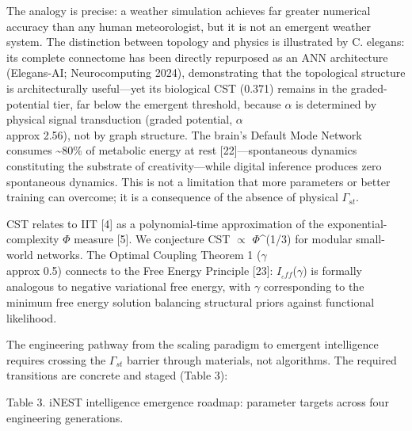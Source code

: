\documentclass[a4paper,12pt]{article}
\begin{document}
The analogy is precise: a weather simulation achieves far greater numerical accuracy than any human meteorologist, but it is not an emergent weather system. The distinction between topology and physics is illustrated by C. elegans: its complete connectome has been directly repurposed as an ANN architecture (Elegans-AI; Neurocomputing 2024), demonstrating that the topological structure is architecturally useful---yet its biological CST (0.371) remains in the graded-potential tier, far below the emergent threshold, because $\alpha$ is determined by physical signal transduction (graded potential, $\alpha$  \\approx  2.56), not by graph structure. The brain's Default Mode Network consumes \textasciitilde{}80\% of metabolic energy at rest [22]---spontaneous dynamics constituting the substrate of creativity---while digital inference produces zero spontaneous dynamics. This is not a limitation that more parameters or better training can overcome; it is a consequence of the absence of physical $\Gamma_{st}$.


CST relates to IIT [4] as a polynomial-time approximation of the exponential-complexity $\Phi$ measure [5]. We conjecture CST $\propto$ $\Phi$^(1/3) for modular small-world networks. The Optimal Coupling Theorem 1 ($\gamma$  \\approx  0.5) connects to the Free Energy Principle [23]: $I_{_eff}$($\gamma$) is formally analogous to negative variational free energy, with $\gamma$ corresponding to the minimum free energy solution balancing structural priors against functional likelihood.


The engineering pathway from the scaling paradigm to emergent intelligence requires crossing the $\Gamma_{st}$ barrier through materials, not algorithms. The required transitions are concrete and staged (Table 3):


Table 3. iNEST intelligence emergence roadmap: parameter targets across four engineering generations.
\end{document}
